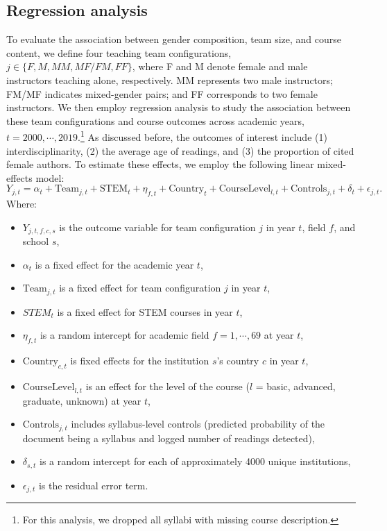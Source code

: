\documentclass[
  british,
  12pt,
]{article}
\begin{document}
\subsection{Regression analysis}\label{regression-analysis}

To evaluate the association between gender composition, team size, and course content, we define four teaching team configurations, \(j\in \{F, M, MM, MF/FM, FF\}\), where F and M denote female and male instructors teaching alone, respectively. MM represents two male instructors; FM/MF indicates mixed-gender pairs; and FF corresponds to two female instructors. We then employ regression analysis to study the association between these team configurations and course outcomes across academic years, \(t = 2000, \cdots, 2019\).\footnote{For this analysis, we dropped all syllabi with missing course description.} As discussed before, the outcomes of interest include (1) interdisciplinarity, (2) the average age of readings, and (3) the proportion of cited female authors. To estimate these effects, we employ the following linear mixed-effects model:
\[
Y_{j, t} = 
 \alpha_t + 
 \text{Team}_{j, t} + 
 \text{STEM}_t + \eta_{f,t} +  %
 \text{Country}_{t} + 
 \text{CourseLevel}_{l,t} + 
 \text{Controls}_{j,t} + 
 \delta_{t} + 
 \epsilon_{j, t}.
\]
Where:

\begin{itemize}
\item
  \(Y_{j, t, f, c, s}\) is the outcome variable for team configuration \(j\) in year \(t\), field \(f\), and school \(s\),
\item
  \(\alpha_{t}\) is a fixed effect for the academic year \(t\),
\item
  \(\text{Team}_{j, t}\) is a fixed effect for team configuration \(j\) in year \(t\),
\item
  \(STEM_{t}\) is a fixed effect for STEM courses in year \(t\),
\item
  \(\eta_{f,t}\) is a random intercept for academic field \(f = 1,\cdots, 69\) at year \(t\),
\item
  \(\text{Country}_{c, t}\) is fixed effects for the institution \(s\)'s country \(c\) in year \(t\),
\item
  \(\text{CourseLevel}_{l, t}\) is an effect for the level of the course (\(l\) = basic, advanced, graduate, unknown) at year \(t\),
\item
  \(\text{Controls}_{j,t}\) includes syllabus-level controls (predicted probability of the document being a syllabus and logged number of readings detected),
\item
  \(\delta_{s, t}\) is a random intercept for each of approximately 4000 unique institutions,
\item
  \(\epsilon_{j,t}\) is the residual error term.
\end{itemize}
\end{document}
